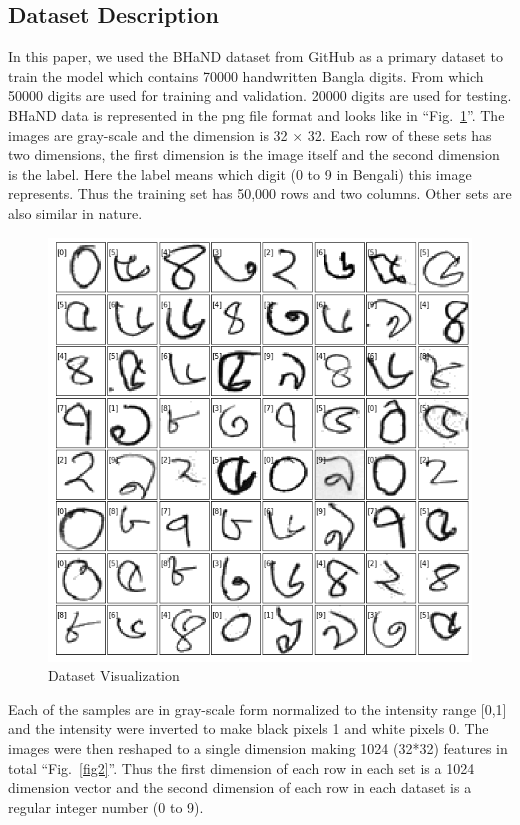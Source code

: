 \documentclass[conference]{IEEEtran}
\begin{document}
\subsection{Dataset Description}
In this paper, we used the BHaND dataset \cite{saadat2016b} from GitHub as a primary dataset to train the model which contains 70000 handwritten Bangla digits. From which 50000 digits are used for training and validation. 20000 digits are used for testing. BHaND data is represented in the png file format and looks like in ``Fig.~\ref{fig1}''. The images are gray-scale and the dimension is 32 × 32. Each row of these sets has two dimensions, the first dimension is the image itself and the second dimension is the label. Here the label means which digit (0 to 9 in Bengali) this image represents. Thus the training set has 50,000 rows and two columns. Other sets are also similar in nature. 

\begin{figure}[htbp]
\centerline{\includegraphics[scale=.4]{fig1.png}}
\caption{Dataset Visualization}
\label{fig1}
\end{figure}

Each of the samples are in gray-scale form normalized to the intensity range [0,1] and the intensity were inverted to make black pixels 1 and white pixels 0. The images were then reshaped to a single dimension making 1024 (32*32) features in total ``Fig.~\ref{fig2}''. Thus the first dimension of each row in each set is a 1024 dimension vector and the second dimension of each row in each dataset is a regular integer number (0 to 9).
\end{document}
